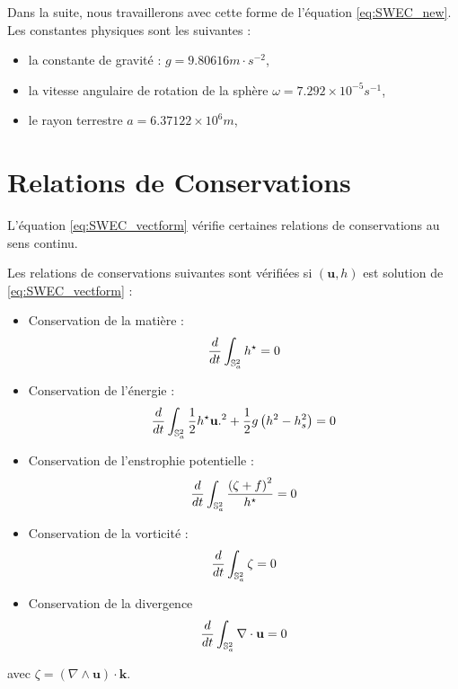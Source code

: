Dans la suite, nous travaillerons avec cette forme de l'équation \eqref{eq:SWEC_new}. Les constantes physiques sont les suivantes :
\begin{itemize}
\item la constante de gravité : $g=9.80616 m \cdot s^{-2}$,
\item la vitesse angulaire de rotation de la sphère $\omega=7.292 \times 10^{-5} s^{-1}$,
\item le rayon terrestre $a=6.37122 \times 10^6 m$,
\end{itemize}


\section{Relations de Conservations}

L'équation \eqref{eq:SWEC_vectform} vérifie certaines relations de conservations au sens continu.

\begin{proposition}
Les relations de conservations suivantes sont vérifiées si $(\mathbf{u},h)$ est solution de \eqref{eq:SWEC_vectform} :
\begin{itemize}
\item Conservation de la matière :
\begin{equation}
\dfrac{d}{dt} \displaystyle\int_{\mathbb{S}_a^2} h^{\star} = 0
\label{eq:mass}
\end{equation}
 
\item Conservation de l'énergie :
\begin{equation}
\dfrac{d}{dt} \displaystyle\int_{\mathbb{S}_a^2} \dfrac{1}{2} h^{\star} \mathbf{u}.^2 + \dfrac{1}{2} g \left( h^2 - h_s^2 \right) = 0
\label{eq:energy}
\end{equation}

\item Conservation de l'enstrophie potentielle :
\begin{equation}
\dfrac{d}{dt} \displaystyle\int_{\mathbb{S}_a^2} \dfrac{\left( \zeta + f \right)^2}{h^{\star}} = 0
\label{eq:enstrophie}
\end{equation}

\item Conservation de la vorticité :
\begin{equation}
\dfrac{d}{dt} \displaystyle\int_{\mathbb{S}_a^2} \zeta = 0
\label{eq:vorticity}
\end{equation}

\item Conservation de la divergence
\begin{equation}
\dfrac{d}{dt} \displaystyle\int_{\mathbb{S}_a^2} \nabla \cdot \mathbf{u} = 0
\label{eq:divergence}
\end{equation}
\end{itemize}

avec $\zeta = \left( \nabla \wedge \mathbf{u} \right) \cdot \mathbf{k}$.
\end{proposition}

